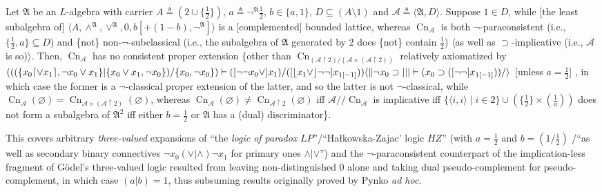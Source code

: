 \documentclass[bsl,meeting]{asl}
\newcommand{\mf}[1]{\mathfrak{#1}}
\newcommand{\mc}[1]{\mathcal{#1}}
\newcommand{\mbf}[1]{\mathbf{#1}}
\newcommand{\couple}[2]{\langle{#1},{#2}\rangle}
\newcommand{\restr}{{\upharpoonright}}
\def\e{{\frac{1}{2}} }
\DeclareMathOperator{\Cn}{Cn}
\begin{document}
\begin{theorem}
\label{main-thm}
Let\/ $\mf{A}$ be an $L$-algebra with carrier
$A\triangleq(2\cup\{\e\})$,
$a\triangleq\neg^\mf{A}\e$,
$b\in\{a,1\}$,
$D\subseteq(A\setminus1)$
and
$\mc{A}\triangleq\couple{\mf{A}}{D}$.
Suppose\/ $1\in D$,
while\/ [the least subalgebra of]\/ %
$\couple{A}{\land^\mf{A},\lor^\mf{A},0,b[+(1-b),\neg^\mf{A}]}$
is a [complemented] bounded lattice, %
whereas\/ $\Cn_\mc{A}$ is both\/
$\neg$-paraconsistent (i.e., $\{\e,a\}\subseteq D$)
and\/ \{not\/\}
non-$\neg$-subclassical (i.e.,
the subalgebra of\/ $\mf{A}$ generated by\/ $2$
does\/ \{not\/\} contain\/ $\e$)
$\langle$as well as\/
$\supset$-implicative
(i.e., $\mc{A}$ is so)\/$\rangle$.
Then, $\Cn_\mc{A}$ has no consistent proper extension\/
\{other than\/
$\Cn_{(\mc{A}\restr2)/(\mc{A}\times(\mc{A}\restr2))}$
relatively axiomatized by\/
$(((\{x_0\lceil\lor x_1\rceil,\neg x_0\lor x_1\}|\{x_0\lor x_1,\neg x_0\})/\{x_0,\neg x_0\})\vdash([\neg\neg x_0\lor] x_1)/([\lfloor x_1\lor\rfloor\neg\neg]\linebreak x_{1[-1]}))\langle\|
\neg x_0\supset|||\vdash(x_0\supset([\neg\neg] x_{1[-1]}))/\rangle$
[unless $a=\e$]
, %
in which case
the former is a\/ $\neg$-classical proper extension of the latter,
and so the latter is not\/ $\neg$-classical,
while\/ $\Cn_\mc{A}(\varnothing)=
\Cn_{\mc{A}\times(\mc{A}\restr2)}(\varnothing)$,
whereas\/ $\Cn_\mc{A}(\varnothing)\neq
\Cn_{\mc{A}\restr2}(\varnothing)$ iff
$\mc{A}/\!/\Cn_\mc{A}$ is implicative
iff\/
$\{\couple{i}{i}\mid i\in2\}\cup(\{\e\}\times(\frac{1}{a}))$
does not form a subalgebra of\/ $\mf{A}^2$
iff  either\/ $b=\e$
or\/ $\mf{A}$ has a (dual)
discriminator\/\}.
\end{theorem}

This covers arbitrary {\em three-valued\/} expansions of
``the {\em logic of paradox} $LP$''/``Ha\l{}kow\-s\-ka-Zajac' logic
$HZ$'' (with $a=\e$ and $b=(1/\e)$
/``as well as secondary binary connectives $\neg x_0(\lor|\land)\neg x_1$
for primary ones $\land|\lor$'') and %
the $\neg$-paraconsistent counterpart of %
the implication-less fragment of G\"{o}del's
three-valued logic %
resulted from leaving non-distinguished $0$ alone and
taking dual pseudo-complement
for pseudo-complement, %
in which case $(a|b)=1$, %
thus subsuming results originally proved by {\sc Pynko} {\em ad hoc}.
\end{document}
